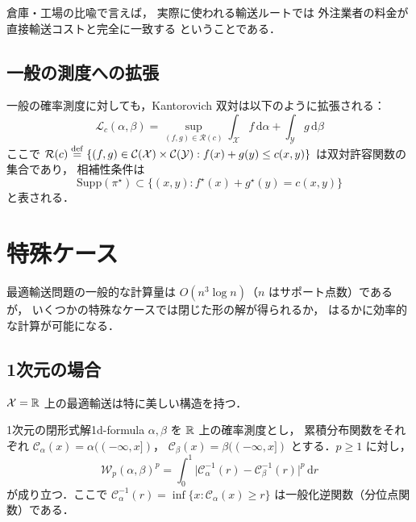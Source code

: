 倉庫・工場の比喩で言えば，
実際に使われる輸送ルートでは
外注業者の料金が直接輸送コストと完全に一致する
ということである．

\subsection{一般の測度への拡張}\label{subsec:dual-general}

一般の確率測度に対しても，Kantorovich 双対は以下のように拡張される：
\begin{equation}\label{eq:dual-general}
  \mathcal{L}_c(\alpha, \beta)
  = \sup_{(f, g) \in \mathcal{R}(c)}
  \int_{\mathcal{X}} f\, \mathrm{d}\alpha
  + \int_{\mathcal{Y}} g\, \mathrm{d}\beta
\end{equation}
ここで
$\mathcal{R}(c) \overset{\mathrm{def}}{=}
\{(f, g) \in \mathcal{C}(\mathcal{X}) \times \mathcal{C}(\mathcal{Y})
: f(x) + g(y) \leq c(x, y)\}$
は双対許容関数の集合であり，
相補性条件は
\[
  \mathrm{Supp}(\pi^\star) \subset
  \{(x, y) : f^\star(x) + g^\star(y) = c(x, y)\}
\]
と表される．


\section{特殊ケース}\label{sec:special}

最適輸送問題の一般的な計算量は
$O(n^3 \log n)$（$n$ はサポート点数）であるが，
いくつかの特殊なケースでは閉じた形の解が得られるか，
はるかに効率的な計算が可能になる．

\subsection{1次元の場合}\label{subsec:1d}

$\mathcal{X} = \mathbb{R}$ 上の最適輸送は特に美しい構造を持つ．

\begin{proposition}{1次元の閉形式解}{1d-formula}
$\alpha, \beta$ を $\mathbb{R}$ 上の確率測度とし，
累積分布関数をそれぞれ
$\mathcal{C}_\alpha(x) = \alpha((-\infty, x])$，
$\mathcal{C}_\beta(x) = \beta((-\infty, x])$
とする．$p \geq 1$ に対し，
\begin{equation}\label{eq:1d-formula}
  \mathcal{W}_p(\alpha, \beta)^p
  = \int_0^1
  \bigl|\mathcal{C}_\alpha^{-1}(r) - \mathcal{C}_\beta^{-1}(r)\bigr|^p
  \, \mathrm{d}r
\end{equation}
が成り立つ．ここで
$\mathcal{C}_\alpha^{-1}(r) = \inf\{x : \mathcal{C}_\alpha(x) \geq r\}$
は一般化逆関数（分位点関数）である．
\end{proposition}

